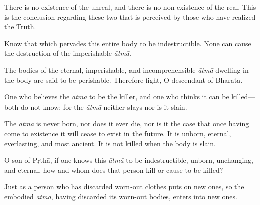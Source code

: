 {There is no existence of the unreal, and there is no non-existence of the real. This is the conclusion regarding these two that is perceived by those who have realized the Truth.}

{Know that which pervades this entire body to be indestructible. None can cause the destruction of the imperishable \textit{ātmā}.}

{The bodies of the eternal, imperishable, and incomprehensible \textit{ātmā} dwelling in the body are said to be perishable. Therefore fight, O descendant of Bharata.}

{One who believes the \textit{ātmā} to be the killer, and one who thinks it can be killed---both do not know; for the \textit{ātmā} neither slays nor is it slain.}

{The \textit{ātmā} is never born, nor does it ever die, nor is it the case that once having come to existence it will cease to exist in the future. It is unborn, eternal, everlasting, and most ancient. It is not killed when the body is slain.}

{O son of Pṛthā, if one knows this \textit{ātmā} to be indestructible, unborn, unchanging, and eternal, how and whom does that person kill or cause to be killed?}

{Just as a person who has discarded worn-out clothes puts on new ones, so the embodied \textit{ātmā}, having discarded its worn-out bodies, enters into new ones.}

